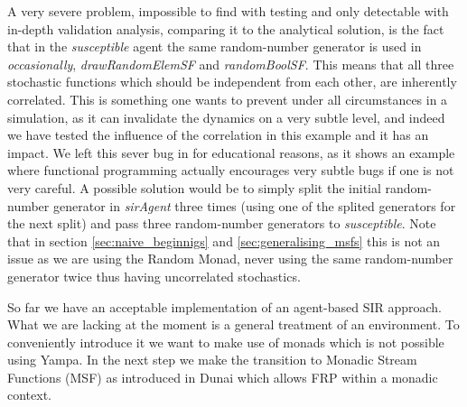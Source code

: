 A very severe problem, impossible to find with testing and only detectable with in-depth validation analysis, comparing it to the analytical solution, is the fact that in the \textit{susceptible} agent the same random-number generator is used in \textit{occasionally}, \textit{drawRandomElemSF} and \textit{randomBoolSF}. This means that all three stochastic functions which should be independent from each other, are inherently correlated. This is something one wants to prevent under all circumstances in a simulation, as it can invalidate the dynamics on a very subtle level, and indeed we have tested the influence of the correlation in this example and it has an impact. We left this sever bug in for educational reasons, as it shows an example where functional programming actually encourages very subtle bugs if one is not very careful. A possible solution would be to simply split the initial random-number generator in \textit{sirAgent} three times (using one of the splited generators for the next split) and pass three random-number generators to \textit{susceptible}. Note that in section \ref{sec:naive_beginnigs} and \ref{sec:generalising_msfs} this is not an issue as we are using the Random Monad, never using the same random-number generator twice thus having uncorrelated stochastics.

So far we have an acceptable implementation of an agent-based SIR approach. What we are lacking at the moment is a general treatment of an environment. To conveniently introduce it we want to make use of monads which is not possible using Yampa. In the next step we make the transition to Monadic Stream Functions (MSF) as introduced in Dunai \cite{perez_functional_2016} which allows FRP within a monadic context.